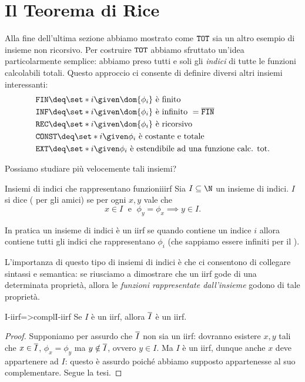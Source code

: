 \section{Il Teorema di Rice}

Alla fine dell'ultima sezione abbiamo mostrato come $\texttt{TOT}$ sia un altro esempio di insieme non ricorsivo. Per costruire $\texttt{TOT}$ abbiamo sfruttato un'idea particolarmente semplice: abbiamo preso tutti e soli gli \emph{indici} di tutte le funzioni calcolabili totali. Questo approccio ci consente di definire diversi altri insiemi interessanti:
\begin{align}\label{eq:interesting-index-sets}
\begin{split}
    &\texttt{FIN} \deq \set*{i \given \dom{\phi_i} \text{ è finito }}\\
    &\texttt{INF} \deq \set*{i \given \dom{\phi_i} \text{ è infinito }} = \compl{\texttt{FIN}} \\
    &\texttt{REC} \deq \set*{i \given \dom{\phi_i} \text{ è ricorsivo }}\\
    &\texttt{CONST} \deq \set*{i \given \phi_i \text{ è costante e totale }}\\
    &\texttt{EXT} \deq \set*{i \given \phi_i \text{ è estendibile ad una funzione calc. tot.}}
\end{split}
\end{align}  

Possiamo studiare più velocemente tali insiemi?

\begin{definition}
    {Insiemi di indici che rappresentano funzioni}{iirf}
    Sia $I \subseteq \N$ un insieme di indici. $I$ si dice  ( per gli amici) se per ogni $x, y$ vale che \[
        x \in I \;\text{ e }\; \phi_y = \phi_x \implies y \in I.
    \]  
\end{definition}

In pratica un insieme di indici è un iirf se quando contiene un indice $i$ allora contiene tutti gli indici che rappresentano $\phi_i$ (che sappiamo essere infiniti per il ). 

L'importanza di questo tipo di insiemi di indici è che ci consentono di collegare sintassi e semantica: se riusciamo a dimostrare che un iirf gode di una determinata proprietà, allora le \emph{funzioni rappresentate dall'insieme} godono di tale proprietà.

\begin{proposition}
    {}{I-iirf=>complI-iirf}
    Se $I$ è un iirf, allora $\overline{I}$ è un iirf. 
\end{proposition}
\begin{proof}
    Supponiamo per assurdo che $\overline{I}$ non sia un iirf: dovranno esistere $x, y$ tali che $x \in \overline{I}$, $\phi_x = \phi_y$ ma $y \notin \overline{I}$, ovvero $y \in I$. Ma $I$ è un iirf, dunque anche $x$ deve appartenere ad $I$: questo è assurdo poiché abbiamo supposto appartenesse al suo complementare. Segue la tesi.
\end{proof}

